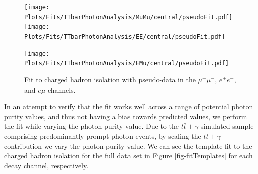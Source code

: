 \begin{figure}
\texttt{[image: Plots/Fits/TTbarPhotonAnalysis/MuMu/central/pseudoFit.pdf]}
\texttt{[image: Plots/Fits/TTbarPhotonAnalysis/EE/central/pseudoFit.pdf]}\\
\begin{center}
\texttt{[image: Plots/Fits/TTbarPhotonAnalysis/EMu/central/pseudoFit.pdf]}
\end{center}
\caption{Fit to charged hadron isolation with pseudo-data in the $\mu^{+}\mu^{-}$, $e^{+}e^{-}$, and $e\mu$ channels.}
\label{fig-pseudofit}
\end{figure}

In an attempt to verify that the fit works well across a range of potential photon purity values, and thus not having a bias towards predicted values, we perform the fit while varying the photon purity value. Due to the $t\bar{t}+\gamma$ simulated sample comprising predominantly prompt photon events, by scaling the $t\bar{t}+\gamma$ contribution we vary the photon purity value. We can see the template fit to the charged hadron isolation for the full data set in Figure \ref{fig-fitTemplates} for each decay channel, respectively.





